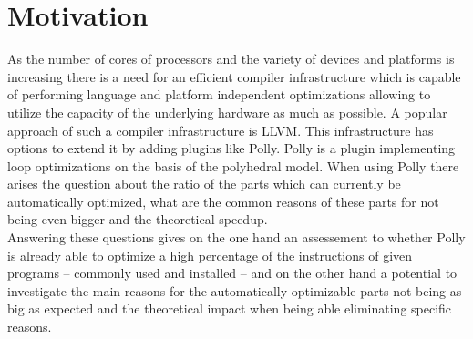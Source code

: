 \chapter{Motivation}
As the number of cores of processors and the variety of devices and platforms is increasing there is a need for an efficient compiler infrastructure which is capable of performing language and platform independent optimizations allowing to utilize the capacity of the underlying hardware as much as possible.
A popular approach of such a compiler infrastructure is LLVM. \cite{LLVMUsers}
This infrastructure has options to extend it by adding plugins like Polly.
Polly is a plugin implementing loop optimizations on the basis of the polyhedral model.
When using Polly there arises the question about the ratio of the parts which can currently be automatically optimized, what are the common reasons of these parts for not being even bigger and the theoretical speedup.\\
Answering these questions gives on the one hand an assessement to whether Polly is already able to optimize a high percentage of the instructions of given programs -- commonly used and installed -- and on the other hand a potential to investigate the main reasons for the automatically optimizable parts not being as big as expected and the theoretical impact when being able eliminating specific reasons.
